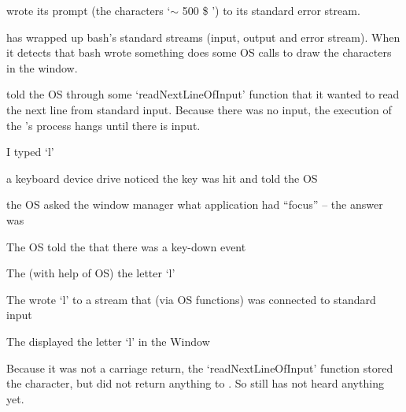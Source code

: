 \documentclass[landscape]{foils}
\begin{document}
\begin{compactitem}
	\item {\color{red} wrote its prompt (the characters `$\sim$ 500 \$ ') to its standard error stream.}
	\item {\color{green} has wrapped up bash's standard streams (input, output and error stream). When
	it detects that bash wrote something  does some OS calls to draw the characters in the window.}
	\item {\color{red} told the OS through some `readNextLineOfInput' function that it wanted to read the next line from standard input.  Because there was no input, the execution of the 's process hangs until there is input.}
	\item I typed `l'
	\begin{compactenum}	
		\item a keyboard device drive noticed the key was hit and told the OS
		\item the OS asked the window manager what application had ``focus'' -- the answer was 
		\item The OS told the  that there was a key-down event
		\item {\color{green}The  (with help of OS)  the letter `l'}
		\item {\color{green}The  wrote `l' to a stream that (via OS functions) was connected to  standard input}
		\item {\color{green}The  displayed the letter `l' in the Window}
		\item {\color{red}Because it was not a carriage return, the `readNextLineOfInput' function stored the character, but did not return anything to . So  still has not heard anything yet.}
	\end{compactenum}
\end{compactitem}
\myNewSlide
\end{document}
